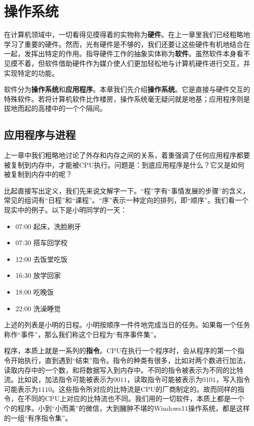 \chapter{操作系统}\label{ch:os}

在计算机领域中，一切看得见摸得着的实物称为\textbf{硬件}。在上一章里我们已经粗略地学习了重要的硬件。然而，光有硬件是不够的，我们还要让这些硬件有机地结合在一起，发挥出特定的作用。指导硬件工作的抽象实体称为\textbf{软件}。虽然软件本身看不见摸不着，但软件借助硬件作为媒介使人们更加轻松地与计算机硬件进行交互，并实现特定的功能。

软件分为\textbf{操作系统}和\textbf{应用程序}。本章我们先介绍\textbf{操作系统}。它是直接与硬件交互的特殊软件。若将计算机软件比作楼房，操作系统毫无疑问就是地基；应用程序则是拔地而起的高楼中的一个个隔间。


\section{应用程序与进程}\label{sec:os_app_process}

上一章中我们粗略地讨论了外存和内存之间的关系，着重强调了任何应用程序都要被复制到内存中，才能被CPU执行。问题是：到底应用程序是什么？它又是如何被复制到内存中的呢？

比起直接写出定义，我们先来说文解字一下。“程”字有“事情发展的步骤”的含义，常见的组词有“日程”和“课程”。“序”表示一种定向的排列，即“顺序”。我们看一个现实中的例子。以下是小明同学的一天：

\begin{itemize}
    \item { 07:00 起床，洗脸刷牙 }
    \item { 07:30 搭车回学校 }
    \item { 12:00 去饭堂吃饭 }
    \item { 16:30 放学回家 }
    \item { 18:00 吃晚饭 }
    \item { 22:00 洗澡睡觉 }
\end{itemize}

上述的列表是小明的日程。小明按顺序一件件地完成当日的任务。如果每一个任务称作“事件”，那么我们称这个日程为“有序事件集”。

程序，本质上就是一系列的\textbf{指令}。CPU在执行一个程序时，会从程序的第一个指令开始执行，直到遇到“结束”指令。指令的种类有很多，比如对两个数进行加法，读取内存中的一个数，和将数据写入到内存中。不同的指令被表示为不同的比特流。比如说，加法指令可能被表示为$0011$，读取指令可能被表示为$0101$，写入指令可能表示为$1110$。这些指令所对应的比特流是CPU的厂商制定的。故而同样的指令，在不同的CPU上对应的比特流也不同。我们用的一切软件，本质上都是一个个的程序。小到“小而美”的微信，大到臃肿不堪的Windows11操作系统，都是这样的一组“有序指令集”。

